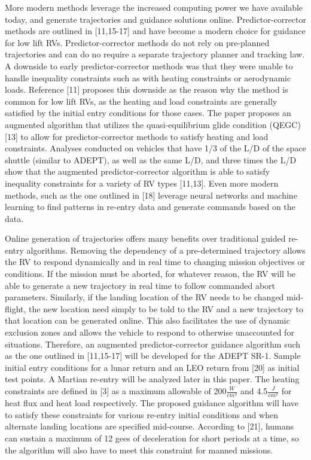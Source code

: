 \documentclass[12pt]{article}
\numberwithin{equation}{section}
\numberwithin{figure}{section}
\numberwithin{table}{section}
\begin{document}
More modern methods leverage the increased computing power we have available today, and generate trajectories and guidance solutions online. Predictor-corrector methods are outlined in [11,15-17] and have become a modern choice for guidance for low lift RVs. Predictor-corrector methods do not rely on pre-planned trajectories and can do no require a separate trajectory planner and tracking law. A downside to early predictor-corrector methods was that they were unable to handle inequality constraints such as with heating constraints or aerodynamic loads. Reference [11] proposes this downside as the reason why the method is common for low lift RVs, as the heating and load constraints are generally satisfied by the initial entry conditions for those cases. The paper proposes an augmented algorithm that utilizes the quasi-equilibrium glide condition (QEGC) [13] to allow for predictor-corrector methods to satisfy heating and load constraints. Analyses conducted on vehicles that have 1/3 of the L/D of the space shuttle (similar to ADEPT), as well as the same L/D, and three times the L/D show that the augmented predictor-corrector algorithm is able to satisfy inequality constraints for a variety of RV types [11,13]. Even more modern methods, such as the one outlined in [18] leverage neural networks and machine learning to find patterns in re-entry data and generate commands based on the data.

Online generation of trajectories offers many benefits over traditional guided re-entry algorithms. Removing the dependency of a pre-determined trajectory allows the RV to respond dynamically and in real time to changing mission objectives or conditions. If the mission must be aborted, for whatever reason, the RV will be able to generate a new trajectory in real time to follow commanded abort parameters. Similarly, if the landing location of the RV needs to be changed mid-flight, the new location need simply to be told to the RV and a new trajectory to that location can be generated online. This also facilitates the use of dynamic exclusion zones and allows the vehicle to respond to otherwise unaccounted for situations. Therefore, an augmented predictor-corrector guidance algorithm such as the one outlined in [11,15-17] will be developed for the ADEPT SR-1. Sample initial entry conditions for a lunar return and an LEO return from [20] as initial test points. A Martian re-entry will be analyzed later in this paper. The heating constraints are defined in [3] as a maximum allowable of 200$\frac{W}{cm^2}$ and 4.5$\frac{J}{cm^2}$ for heat flux and heat load respectively. The proposed guidance algorithm will have to satisfy these constraints for various re-entry initial conditions and when alternate landing locations are specified mid-course. According to [21], humans can sustain a maximum of 12 gees of deceleration for short periods at a time, so the algorithm will also have to meet this constraint for manned missions.
\end{document}
